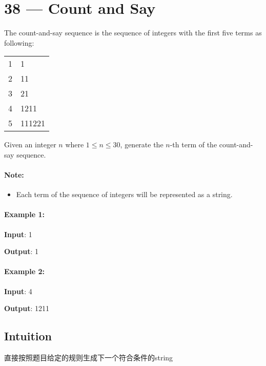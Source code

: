 \section{38 --- Count and Say}
The count-and-say sequence is the sequence of integers with the first five terms as following:

\begin{table}[H]
\begin{tabular}{ll}
1 & 1\\
2 & 11\\
3 & 21\\
4 & 1211\\
5 & 111221 
\end{tabular}
\end{table}

Given an integer $n$ where $1 \leq n \leq 30$, generate the $n$-th term of the count-and-say sequence.

\paragraph{Note:} 

\begin{itemize}
\item Each term of the sequence of integers will be represented as a string.
\end{itemize}

 

\paragraph{Example 1:}

\begin{flushleft}
\textbf{Input}: 1

\textbf{Output}: 1
\end{flushleft}

\paragraph{Example 2:}

\begin{flushleft}
\textbf{Input}: 4

\textbf{Output}: 1211
\end{flushleft}

\subsection{Intuition}
直接按照题目给定的规则生成下一个符合条件的string


